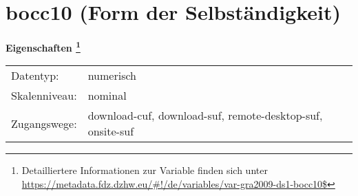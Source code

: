 
    \setcounter{footnote}{0}

    \vspace*{-1.8cm}
	\section{bocc10 (Form der Selbständigkeit)}
	\label{section:bocc10}



    \vspace*{0.5cm}
    \noindent\textbf{Eigenschaften
	\footnote{Detailliertere Informationen zur Variable finden sich unter
		\url{https://metadata.fdz.dzhw.eu/\#!/de/variables/var-gra2009-ds1-bocc10$}}}\\
	\begin{tabularx}{\hsize}{@{}lX}
	Datentyp: & numerisch \\
	Skalenniveau: & nominal \\
	Zugangswege: &
	  download-cuf, 
	  download-suf, 
	  remote-desktop-suf, 
	  onsite-suf
 \\
    \end{tabularx}



